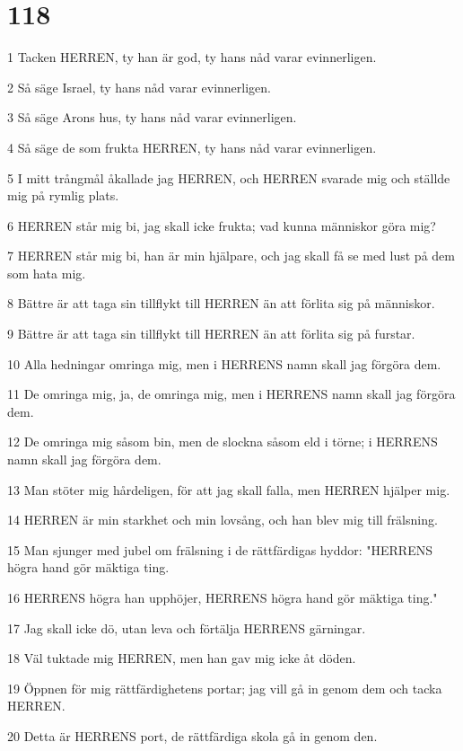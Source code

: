 \chapter{118}

\par 1 Tacken HERREN, ty han är god, ty hans nåd varar evinnerligen.
\par 2 Så säge Israel, ty hans nåd varar evinnerligen.
\par 3 Så säge Arons hus, ty hans nåd varar evinnerligen.
\par 4 Så säge de som frukta HERREN, ty hans nåd varar evinnerligen.
\par 5 I mitt trångmål åkallade jag HERREN, och HERREN svarade mig och ställde mig på rymlig plats.
\par 6 HERREN står mig bi, jag skall icke frukta; vad kunna människor göra mig?
\par 7 HERREN står mig bi, han är min hjälpare, och jag skall få se med lust på dem som hata mig.
\par 8 Bättre är att taga sin tillflykt till HERREN än att förlita sig på människor.
\par 9 Bättre är att taga sin tillflykt till HERREN än att förlita sig på furstar.
\par 10 Alla hedningar omringa mig, men i HERRENS namn skall jag förgöra dem.
\par 11 De omringa mig, ja, de omringa mig, men i HERRENS namn skall jag förgöra dem.
\par 12 De omringa mig såsom bin, men de slockna såsom eld i törne; i HERRENS namn skall jag förgöra dem.
\par 13 Man stöter mig hårdeligen, för att jag skall falla, men HERREN hjälper mig.
\par 14 HERREN är min starkhet och min lovsång, och han blev mig till frälsning.
\par 15 Man sjunger med jubel om frälsning i de rättfärdigas hyddor: "HERRENS högra hand gör mäktiga ting.
\par 16 HERRENS högra han upphöjer, HERRENS högra hand gör mäktiga ting."
\par 17 Jag skall icke dö, utan leva och förtälja HERRENS gärningar.
\par 18 Väl tuktade mig HERREN, men han gav mig icke åt döden.
\par 19 Öppnen för mig rättfärdighetens portar; jag vill gå in genom dem och tacka HERREN.
\par 20 Detta är HERRENS port, de rättfärdiga skola gå in genom den.
